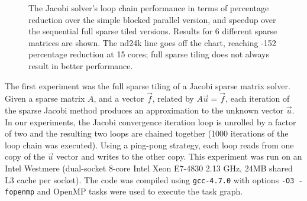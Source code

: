 \begin{figure}[t]
\centerline{
}
\caption{The Jacobi solver's loop chain performance in terms of percentage reduction over the simple blocked parallel version, and speedup over the sequential full sparse tiled versions. Results for 6 different sparse matrices are shown. The nd24k line goes off the chart, reaching -152 percentage reduction at 15 cores; full sparse tiling does not always result in better performance.}
\label{fig:jacobi}
\end{figure}

The first experiment was the full sparse tiling of a Jacobi sparse matrix solver. Given a sparse matrix $A$,
and a vector $\vec{f}$, related by $A\vec{u}=\vec{f}$, each iteration of the sparse Jacobi method produces
an approximation to the unknown vector $\vec{u}$. In our experiments, the Jacobi convergence 
iteration loop is unrolled by a factor of two and the resulting two loops are chained together 
(1000 iterations of the loop chain
was executed).
Using a ping-pong strategy, each loop reads from one copy of the $\vec{u}$ vector 
and writes to the other copy. This experiment was run on an Intel Westmere 
(dual-socket 8-core Intel Xeon E7-4830 2.13 GHz, 24MB shared L3 cache per socket).
The code was compiled using {\tt gcc-4.7.0} with options {\tt -O3 -fopenmp} and OpenMP tasks were used
to execute the task graph. 

